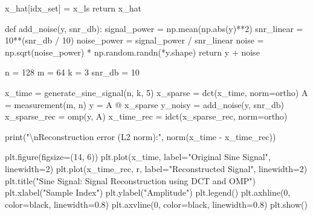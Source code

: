\documentclass[
  letterpaper,
  DIV=11,
  numbers=noendperiod]{scrartcl}
\newenvironment{Shaded}{\begin{snugshade}}{\end{snugshade}}
\newcommand{\BuiltInTok}[1]{\textcolor[rgb]{0.40,0.85,0.94}{#1}}
\newcommand{\CharTok}[1]{\textcolor[rgb]{0.90,0.86,0.45}{#1}}
\newcommand{\ControlFlowTok}[1]{\textcolor[rgb]{0.98,0.15,0.45}{#1}}
\newcommand{\DecValTok}[1]{\textcolor[rgb]{0.68,0.51,1.00}{#1}}
\newcommand{\FloatTok}[1]{\textcolor[rgb]{0.68,0.51,1.00}{#1}}
\newcommand{\KeywordTok}[1]{\textcolor[rgb]{0.98,0.15,0.45}{#1}}
\newcommand{\NormalTok}[1]{\textcolor[rgb]{0.97,0.97,0.95}{#1}}
\newcommand{\OperatorTok}[1]{\textcolor[rgb]{0.97,0.97,0.95}{#1}}
\newcommand{\StringTok}[1]{\textcolor[rgb]{0.90,0.86,0.45}{#1}}
\begin{document}
\begin{Shaded}
\begin{Highlighting}[]
\NormalTok{    x\_hat[idx\_set] }\OperatorTok{=}\NormalTok{ x\_ls}
    \ControlFlowTok{return}\NormalTok{ x\_hat}

\KeywordTok{def}\NormalTok{ add\_noise(y, snr\_db):}
\NormalTok{    signal\_power }\OperatorTok{=}\NormalTok{ np.mean(np.}\BuiltInTok{abs}\NormalTok{(y)}\OperatorTok{**}\DecValTok{2}\NormalTok{)}
\NormalTok{    snr\_linear }\OperatorTok{=} \DecValTok{10}\OperatorTok{**}\NormalTok{(snr\_db }\OperatorTok{/} \DecValTok{10}\NormalTok{)}
\NormalTok{    noise\_power }\OperatorTok{=}\NormalTok{ signal\_power }\OperatorTok{/}\NormalTok{ snr\_linear}
\NormalTok{    noise }\OperatorTok{=}\NormalTok{ np.sqrt(noise\_power) }\OperatorTok{*}\NormalTok{ np.random.randn(}\OperatorTok{*}\NormalTok{y.shape)}
    \ControlFlowTok{return}\NormalTok{ y }\OperatorTok{+}\NormalTok{ noise}

\NormalTok{n }\OperatorTok{=} \DecValTok{128}
\NormalTok{m }\OperatorTok{=} \DecValTok{64}
\NormalTok{k }\OperatorTok{=} \DecValTok{3}
\NormalTok{snr\_db }\OperatorTok{=} \DecValTok{10}

\NormalTok{x\_time }\OperatorTok{=}\NormalTok{ generate\_sine\_signal(n, k, }\DecValTok{5}\NormalTok{)}
\NormalTok{x\_sparse }\OperatorTok{=}\NormalTok{ dct(x\_time, norm}\OperatorTok{=}\StringTok{\textquotesingle{}ortho\textquotesingle{}}\NormalTok{)}
\NormalTok{A }\OperatorTok{=}\NormalTok{ measurement(m, n)}
\NormalTok{y }\OperatorTok{=}\NormalTok{ A }\OperatorTok{@}\NormalTok{ x\_sparse}
\NormalTok{y\_noisy }\OperatorTok{=}\NormalTok{ add\_noise(y, snr\_db)}
\NormalTok{x\_sparse\_rec }\OperatorTok{=}\NormalTok{ omp(y, A)}
\NormalTok{x\_time\_rec }\OperatorTok{=}\NormalTok{ idct(x\_sparse\_rec, norm}\OperatorTok{=}\StringTok{\textquotesingle{}ortho\textquotesingle{}}\NormalTok{)}

\BuiltInTok{print}\NormalTok{(}\StringTok{"}\CharTok{\textbackslash{}n}\StringTok{Reconstruction error (L2 norm):"}\NormalTok{, norm(x\_time }\OperatorTok{{-}}\NormalTok{ x\_time\_rec))}

\NormalTok{plt.figure(figsize}\OperatorTok{=}\NormalTok{(}\DecValTok{14}\NormalTok{, }\DecValTok{6}\NormalTok{))}
\NormalTok{plt.plot(x\_time, label}\OperatorTok{=}\StringTok{"Original Sine Signal"}\NormalTok{, linewidth}\OperatorTok{=}\DecValTok{2}\NormalTok{)}
\NormalTok{plt.plot(x\_time\_rec, }\StringTok{\textquotesingle{}{-}{-}r\textquotesingle{}}\NormalTok{, label}\OperatorTok{=}\StringTok{"Reconstructed Signal"}\NormalTok{, linewidth}\OperatorTok{=}\DecValTok{2}\NormalTok{)}
\NormalTok{plt.title(}\StringTok{"Sine Signal: Signal Reconstruction using DCT and OMP"}\NormalTok{)}
\NormalTok{plt.xlabel(}\StringTok{"Sample Index"}\NormalTok{)}
\NormalTok{plt.ylabel(}\StringTok{"Amplitude"}\NormalTok{)}
\NormalTok{plt.legend()}
\NormalTok{plt.axhline(}\DecValTok{0}\NormalTok{, color}\OperatorTok{=}\StringTok{\textquotesingle{}black\textquotesingle{}}\NormalTok{, linewidth}\OperatorTok{=}\FloatTok{0.8}\NormalTok{)}
\NormalTok{plt.axvline(}\DecValTok{0}\NormalTok{, color}\OperatorTok{=}\StringTok{\textquotesingle{}black\textquotesingle{}}\NormalTok{, linewidth}\OperatorTok{=}\FloatTok{0.8}\NormalTok{)}
\NormalTok{plt.show()}
\end{Highlighting}
\end{Shaded}
\end{document}

